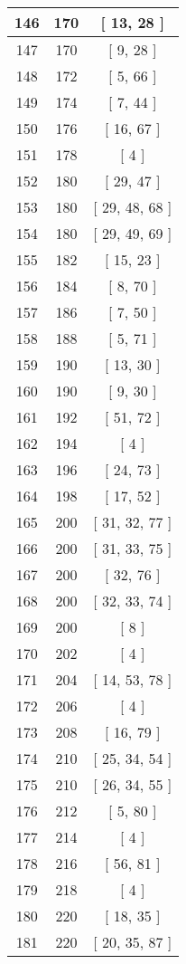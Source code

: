 \begin{center}
\begin{longtable}[H]{|| c c c ||}
\hline
146 & 170 & [ 13, 28 ] \\ 
\hline
147 & 170 & [ 9, 28 ] \\ 
\hline
148 & 172 & [ 5, 66 ] \\ 
\hline
149 & 174 & [ 7, 44 ] \\ 
\hline
150 & 176 & [ 16, 67 ] \\ 
\hline
151 & 178 & [ 4 ] \\ 
\hline
152 & 180 & [ 29, 47 ] \\ 
\hline
153 & 180 & [ 29, 48, 68 ] \\ 
\hline
154 & 180 & [ 29, 49, 69 ] \\ 
\hline
155 & 182 & [ 15, 23 ] \\ 
\hline
156 & 184 & [ 8, 70 ] \\ 
\hline
157 & 186 & [ 7, 50 ] \\ 
\hline
158 & 188 & [ 5, 71 ] \\ 
\hline
159 & 190 & [ 13, 30 ] \\ 
\hline
160 & 190 & [ 9, 30 ] \\ 
\hline
161 & 192 & [ 51, 72 ] \\ 
\hline
162 & 194 & [ 4 ] \\ 
\hline
163 & 196 & [ 24, 73 ] \\ 
\hline
164 & 198 & [ 17, 52 ] \\ 
\hline
165 & 200 & [ 31, 32, 77 ] \\ 
\hline
166 & 200 & [ 31, 33, 75 ] \\ 
\hline
167 & 200 & [ 32, 76 ] \\ 
\hline
168 & 200 & [ 32, 33, 74 ] \\ 
\hline
169 & 200 & [ 8 ] \\ 
\hline
170 & 202 & [ 4 ] \\ 
\hline
171 & 204 & [ 14, 53, 78 ] \\ 
\hline
172 & 206 & [ 4 ] \\ 
\hline
173 & 208 & [ 16, 79 ] \\ 
\hline
174 & 210 & [ 25, 34, 54 ] \\ 
\hline
175 & 210 & [ 26, 34, 55 ] \\ 
\hline
176 & 212 & [ 5, 80 ] \\ 
\hline
177 & 214 & [ 4 ] \\ 
\hline
178 & 216 & [ 56, 81 ] \\ 
\hline
179 & 218 & [ 4 ] \\ 
\hline
180 & 220 & [ 18, 35 ] \\ 
\hline
181 & 220 & [ 20, 35, 87 ] \\ 

\end{longtable}
\end{center}
